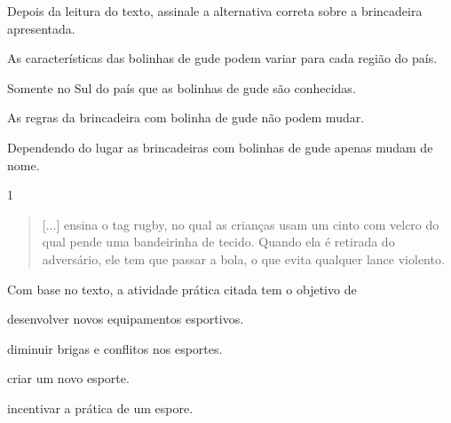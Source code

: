 Depois da leitura do texto, assinale a alternativa correta sobre a
brincadeira apresentada.

\begin{escolha}
\item
  As características das bolinhas de gude podem variar para cada região
  do país.
\item
  Somente no Sul do país que as bolinhas de gude são conhecidas.
\item
  As regras da brincadeira com bolinha de gude não podem mudar.
\item
  Dependendo do lugar as brincadeiras com bolinhas de gude apenas mudam
  de nome.
\end{escolha}



\num{1}
\begin{quote}
  {[}...{]} ensina o tag rugby, no qual as crianças usam um cinto com
  velcro do qual pende uma bandeirinha de tecido. Quando ela é retirada
  do adversário, ele tem que passar a bola, o que evita qualquer lance
  violento.

\end{quote}

Com base no texto, a atividade prática citada tem o objetivo de

\begin{escolha}
\item desenvolver novos equipamentos esportivos.

\item diminuir brigas e conflitos nos esportes.

\item criar um novo esporte.

\item incentivar a prática de um espore.
\end{escolha}

